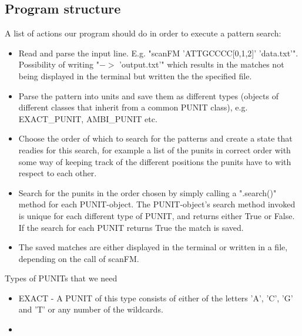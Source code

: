 \documentclass[12pt]{article}
\begin{document}
\subsection{Program structure}
A list of actions our program should do in order to execute a pattern search:
\begin{itemize}
\item Read and parse the input line. E.g. "scanFM 'ATTGCCCC[0,1,2]' 'data.txt'". Possibility of writing "$->$ 'output.txt'"
which results in the matches not being displayed in the terminal but written the the specified file.
\item Parse the pattern into units and save them as different types (objects of different classes that inherit
from a common PUNIT class), e.g. EXACT\_PUNIT, AMBI\_PUNIT etc.
\item Choose the order of which to search for the patterns and create a state that readies for this search, for example a 
list of the punits in correct order with some way of keeping track of the different positions the punits have to with
respect to each other.
\item Search for the punits in the order chosen by simply calling a ".search()" method for each PUNIT-object.
The PUNIT-object's search method invoked is unique for each different type of PUNIT, and returns either True or False.
If the search for each PUNIT returns True the match is saved.
\item The saved matches are either displayed in the terminal or written in a file, depending on the call of scanFM. 
\end{itemize}
Types of PUNITs that we need
\begin{itemize}
\item EXACT - A PUNIT of this type consists of either of the letters 'A', 'C', 'G' and 'T' or any number of the wildcards.
\item  
\end{itemize}
\end{document}
